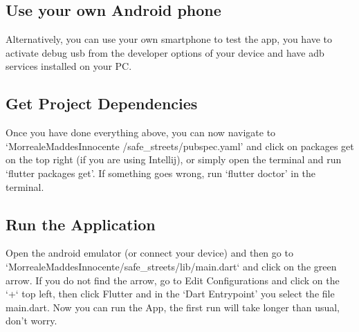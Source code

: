 \documentclass[../ITD.tex]{subfiles}
\begin{document}
\subsection{Use your own Android phone}\label{subsec:use-your-own-android-phone}
    Alternatively, you can use your own smartphone to test the app, you have to activate debug usb from
    the developer options of your device and have adb services installed on your PC.

\subsection{Get Project Dependencies}\label{subsec:get-project-dependencies}
    Once you have done everything above, you can now navigate to `MorrealeMaddesInnocente
    /safe\_streets/pubspec.yaml'
    and click on packages get on the top right (if you are using Intellij), or simply open the terminal and run
    `flutter packages get'.
    If something goes wrong, run `flutter doctor' in the terminal.
\subsection{Run the Application}\label{subsec:run-the-application}
    Open the android emulator (or connect your device) and then go to\newline
    `MorrealeMaddesInnocente/safe\_streets/lib/main.dart` and click on the green arrow.
    If you do not find the arrow, go to Edit Configurations and click on the `+` top left,
    then click Flutter and in the `Dart Entrypoint' you select the file main.dart.
    Now you can run the App, the first run will take longer than usual, don't worry.
\end{document}
